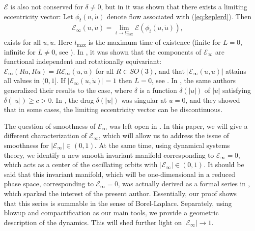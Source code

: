 \documentclass[reqno,12pt]{amsart}
\renewcommand{\eqref}[1]{(\ref{eq:#1})}
\numberwithin{equation}{section}
\begin{document}
$\mathcal E$ is also not conserved for $\delta\ne 0$, but in \cite{margheri2017a} it was shown that there exists a limiting eccentricity vector: Let $\phi_t(u,\dot u)$ denote flow associated with \eqref{keplerd}. Then 
\begin{align*}
 \mathcal E_\infty(u,\dot u) = \lim_{t\rightarrow t_{\text{max}}^-} \mathcal E(\phi_t(u,\dot u)),
\end{align*}
exists for all $u,\dot u$. Here $t_{\text{max}}$ is the maximum time of existence (finite for $L=0$, infinite for $L\ne 0$, see \cite{margheri2014a}). In \cite{margheri2017a}, it was shown that the components of $\mathcal E_\infty$ are functional independent and rotationally equivariant: $\mathcal E_\infty (R u,R\dot u)=R \mathcal E_\infty(u,\dot u)$ for all $R\in SO(3)$, and that $\vert \mathcal E_\infty(u,\dot u)\vert$ attains all values in $(0,1]$. If $\vert \mathcal E_\infty(u,\dot u)\vert=1$ then $L=0$, see \cite{margheri2017a}. %
In \cite{margheri2017ab}, the same authors generalized their results to the case, where $\delta$ is a function $\delta(\vert u\vert)$ of $\vert u\vert$ satisfying $\delta(\vert u\vert)\ge c>0$. In \cite{margheri2020a}, the drag $\delta(\vert u\vert)$ was singular at $u=0$, and they showed that in some cases, the limiting eccentricity vector can be discontinuous.

The question of smoothness of $\mathcal E_\infty$ was left open in \cite{margheri2017a}. 
In this paper, we will give a different characterization of $\mathcal E_\infty$, which will allow us to address the issue of smoothness for $\vert \mathcal E_\infty\vert\in (0,1)$. At the same time, using dynamical systems theory, we identify a new smooth invariant manifold corresponding to $\mathcal E_\infty=0$, which acts as a center of the oscillating orbits with $\vert \mathcal E_\infty\vert\in (0,1)$. %
It should be said that this invariant manifold, which will be one-dimensional in a reduced phase space, corresponding to $\mathcal E_\infty=0$, was actually derived as a formal series in \cite{haraux2021a}, which sparked the interest of the present author. Essentially, our proof shows that this series is summable in the sense of Borel-Laplace. 
Separately, using blowup and compactification as our main tools, we provide a geometric description of the  dynamics. This will shed further light on $\vert \mathcal E_\infty\vert\rightarrow 1$. 
\end{document}
